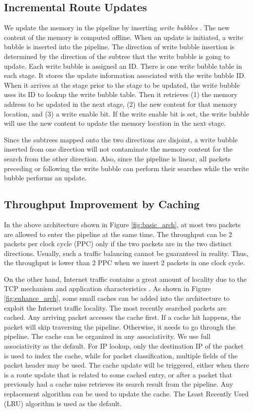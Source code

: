 \documentclass{sigcomm-alternate}
\begin{document}
\subsection{Incremental Route Updates}

We update the memory in the pipeline by inserting \textit{write bubbles} \cite{infocom03:basu}. The new content of the memory is computed offline. When an update is initiated, a write bubble is inserted into the pipeline. The direction of write bubble insertion is determined by the direction of the subtree that the write bubble is going to update. Each write bubble is assigned an ID. There is one write bubble table in each stage. It stores the update information associated with the write bubble ID. When it arrives at the stage prior to the stage to be updated, the write bubble uses its ID to lookup the write bubble table. Then it retrieves (1) the memory address to be updated in the next stage, (2) the new content for that memory location, and (3) a write enable bit. If the write enable bit is set, the write bubble will use the new content to update the memory location in the next stage. 

Since the subtrees mapped onto the two directions are disjoint, a write bubble inserted from one direction will not contaminate the memory content for the search from the other direction. Also, since the pipeline is linear, all packets preceding or following the write bubble can perform their searches while the write bubble performs an update.


\subsection{Throughput Improvement by Caching}

In the above architecture shown in Figure \ref{fig:basic_arch}, at most two packets are allowed to enter the pipeline at the same time. The throughput can be 2 packets per clock cycle (PPC) only if the two packets are in the two distinct directions. Usually, such a traffic balancing cannot be guaranteed in reality. Thus, the throughput is lower than 2 PPC when we insert 2 packets in one clock cycle.

On the other hand, Internet traffic contains a great amount of locality due to the TCP mechanism and application characteristics \cite{infocom08:jiang}. As shown in Figure \ref{fig:enhance_arch}, some small caches can be added into the architecture to exploit the Internet traffic locality. The most recently searched packets are cached. Any arriving packet accesses the cache first. If a cache hit happens, the packet will skip traversing the pipeline. Otherwise, it needs to go through the pipeline. The cache can be organized in any associativity. We use full associativity as the default. For IP lookup, only the destination IP of the packet is used to index the cache, while for packet classification, multiple fields of the packet header may be used. The cache update will be triggered, either when there is a route update that is related to some cached entry, or after a packet that previously had a cache miss retrieves its search result from the pipeline. Any replacement algorithm can be used to update the cache. The Least Recently Used (LRU) algorithm is used as the default.
\end{document}
